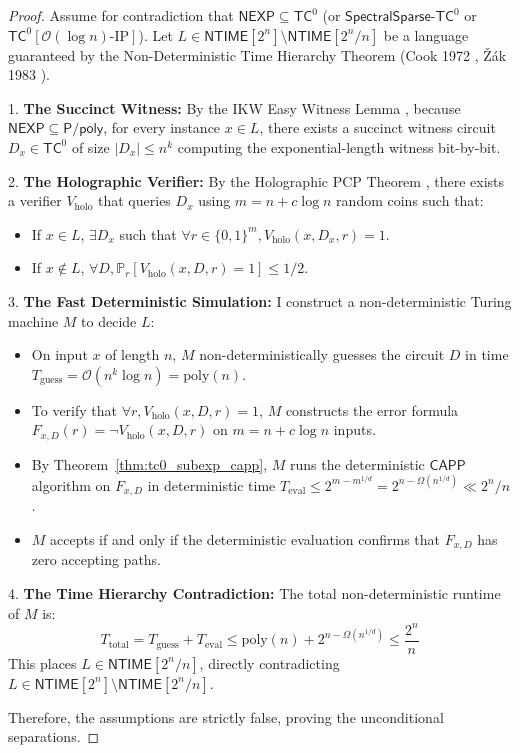 \documentclass[11pt,a4paper]{article}
\theoremstyle{definition}
\theoremstyle{remark}
\newcommand{\Ppoly}{\mathsf{P/poly}}
\newcommand{\NEXP}{\mathsf{NEXP}}
\newcommand{\TC}{\mathsf{TC}}
\newcommand{\NTIME}{\mathsf{NTIME}}
\newcommand{\poly}{\mathrm{poly}}
\newcommand{\CAPP}{\mathsf{CAPP}}
\newcommand{\SparseTC}{\mathsf{SpectralSparse}\text{-}\mathsf{TC}^0}
\begin{document}
\begin{proof}
Assume for contradiction that $\NEXP \subseteq \TC^0$ (or $\SparseTC$ or $\TC^0[\mathcal{O}(\log n)\text{-}\mathrm{IP}]$).
Let $L \in \NTIME[2^n] \setminus \NTIME[2^n / n]$ be a language guaranteed by the Non-Deterministic Time Hierarchy Theorem (Cook 1972 \cite{cook72}, Žák 1983 \cite{zak83}).

1. \textbf{The Succinct Witness:} By the IKW Easy Witness Lemma \cite{ikw02}, because $\NEXP \subseteq \Ppoly$, for every instance $x \in L$, there exists a succinct witness circuit $D_x \in \TC^0$ of size $|D_x| \le n^k$ computing the exponential-length witness bit-by-bit.

2. \textbf{The Holographic Verifier:} By the Holographic PCP Theorem \cite{bfls91}, there exists a verifier $V_{\mathrm{holo}}$ that queries $D_x$ using $m = n + c \log n$ random coins such that:
\begin{itemize}
    \item If $x \in L$, $\exists D_x$ such that $\forall r \in \{0,1\}^m, V_{\mathrm{holo}}(x, D_x, r) = 1$.
    \item If $x \notin L$, $\forall D, \mathbb{P}_r[V_{\mathrm{holo}}(x, D, r) = 1] \le 1/2$.
\end{itemize}

3. \textbf{The Fast Deterministic Simulation:} I construct a non-deterministic Turing machine $M$ to decide $L$:
\begin{itemize}
    \item On input $x$ of length $n$, $M$ non-deterministically guesses the circuit $D$ in time $T_{\mathrm{guess}} = \mathcal{O}(n^k \log n) = \poly(n)$.
    \item To verify that $\forall r, V_{\mathrm{holo}}(x, D, r) = 1$, $M$ constructs the error formula $F_{x,D}(r) = \neg V_{\mathrm{holo}}(x, D, r)$ on $m = n + c \log n$ inputs.
    \item By Theorem~\ref{thm:tc0_subexp_capp}, $M$ runs the deterministic $\CAPP$ algorithm on $F_{x,D}$ in deterministic time $T_{\mathrm{eval}} \le 2^{m - m^{1/d}} = 2^{n - \Omega(n^{1/d})} \ll 2^n / n$.
    \item $M$ accepts if and only if the deterministic evaluation confirms that $F_{x,D}$ has zero accepting paths.
\end{itemize}

4. \textbf{The Time Hierarchy Contradiction:} The total non-deterministic runtime of $M$ is:
\[
T_{\mathrm{total}} = T_{\mathrm{guess}} + T_{\mathrm{eval}} \le \poly(n) + 2^{n - \Omega(n^{1/d})} \le \frac{2^n}{n}
\]
This places $L \in \NTIME[2^n / n]$, directly contradicting $L \in \NTIME[2^n] \setminus \NTIME[2^n / n]$.

Therefore, the assumptions are strictly false, proving the unconditional separations.
\end{proof}
\end{document}

